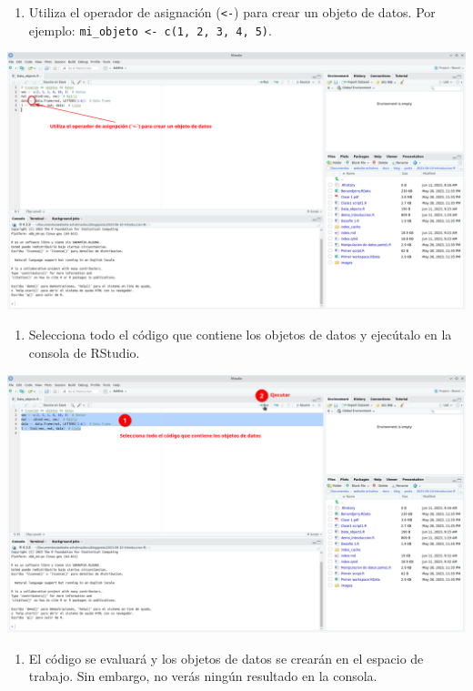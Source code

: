 \documentclass[
  letterpaper,
  DIV=11,
  numbers=noendperiod]{scrartcl}
\providecommand{\tightlist}{%
  \setlength{\itemsep}{0pt}\setlength{\parskip}{0pt}}\usepackage{longtable,booktabs,array}
\begin{document}
\begin{enumerate}
\def\labelenumi{\arabic{enumi}.}
\tightlist
\item
  Utiliza el operador de asignación (\texttt{\textless{}-}) para crear
  un objeto de datos. Por ejemplo:
  \texttt{mi\_objeto\ \textless{}-\ c(1,\ 2,\ 3,\ 4,\ 5)}.
\end{enumerate}

\includegraphics{images/Screenshot_20230611_092644.png}

\begin{enumerate}
\def\labelenumi{\arabic{enumi}.}
\setcounter{enumi}{1}
\tightlist
\item
  Selecciona todo el código que contiene los objetos de datos y
  ejecútalo en la consola de RStudio.
\end{enumerate}

\includegraphics{images/Screenshot_20230611_093536.png}

\begin{enumerate}
\def\labelenumi{\arabic{enumi}.}
\setcounter{enumi}{2}
\tightlist
\item
  El código se evaluará y los objetos de datos se crearán en el espacio
  de trabajo. Sin embargo, no verás ningún resultado en la consola.
\end{enumerate}
\end{document}
